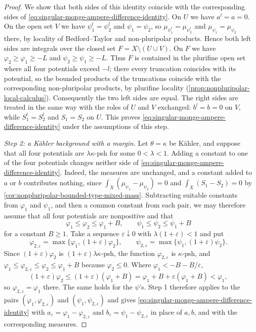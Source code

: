 \begin{proof}
We show that both sides of this identity coincide with the corresponding sides of \eqref{eq:singular-monge-ampere-difference-identity}. On $U$ we have $a^l=a=0$. On the open set $V$ we have $\psi_1^l=\psi_2^l$ and $\psi_1=\psi_2$, so $\mu_{\psi_1^l}=\mu_{\psi_2^l}$ and $\mu_{\psi_1}=\mu_{\psi_2}$ there, by locality of Bedford--Taylor and non-pluripolar products. Hence both left sides are integrals over the closed set $F=X\setminus(U\cup V)$. On $F$ we have $\varphi_2\geq\varphi_1\geq-L$ and $\psi_2\geq\psi_1\geq-L$. Thus $F$ is contained in the plurifine open set where all four potentials exceed $-l$; there every truncation coincides with its potential, so the bounded products of the truncations coincide with the corresponding non-pluripolar products, by plurifine locality (\cref{prop:nonpluripolar-local-calculus}). Consequently the two left sides are equal. The right sides are treated in the same way with the roles of $U$ and $V$ exchanged: $b^l=b=0$ on $V$, while $S_1^l=S_2^l$ and $S_1=S_2$ on $U$. This proves \eqref{eq:singular-monge-ampere-difference-identity} under the assumptions of this step.

\emph{Step 2: a K\"ahler background with a margin.} Let $\theta=\kappa$ be K\"ahler, and suppose that all four potentials are $\lambda\kappa$-psh for some $0<\lambda<1$. Adding a constant to one of the four potentials changes neither side of \eqref{eq:singular-monge-ampere-difference-identity}. Indeed, the measures are unchanged, and a constant added to $a$ or $b$ contributes nothing, since $\int_X(\mu_{\psi_1}-\mu_{\psi_2})=0$ and $\int_X(S_1-S_2)=0$ by \cref{cor:nonpluripolar-bounded-type-mixed-mass}. Subtracting suitable constants from $\varphi_1$ and $\psi_1$, and then a common constant from each pair, we may therefore assume that all four potentials are nonpositive and that
\[
 \varphi_1\leq\varphi_2\leq\varphi_1+B,
                 \qquad\psi_1\leq\psi_2\leq\psi_1+B
\]
for a constant $B\geq1$. Take a sequence $\varepsilon\downarrow0$ with $\lambda(1+\varepsilon)<1$ and put
\[
 \varphi_{2,\varepsilon}=\max\{\varphi_1,(1+\varepsilon)\varphi_2\},
 \qquad\psi_{2,\varepsilon}=\max\{\psi_1,(1+\varepsilon)\psi_2\}.
\]
Since $(1+\varepsilon)\varphi_2$ is $(1+\varepsilon)\lambda\kappa$-psh, the function $\varphi_{2,\varepsilon}$ is $\kappa$-psh, and $\varphi_1\leq\varphi_{2,\varepsilon}\leq\varphi_2\leq\varphi_1+B$ because $\varphi_2\leq0$. Where $\varphi_1<-B-B/\varepsilon$,
\[
 (1+\varepsilon)\varphi_2\leq(1+\varepsilon)(\varphi_1+B)=\varphi_1+B+\varepsilon(\varphi_1+B)<\varphi_1,
\]
so $\varphi_{2,\varepsilon}=\varphi_1$ there. The same holds for the $\psi$'s. Step 1 therefore applies to the pairs $(\varphi_1,\varphi_{2,\varepsilon})$ and $(\psi_1,\psi_{2,\varepsilon})$ and gives \eqref{eq:singular-monge-ampere-difference-identity} with $a_\varepsilon=\varphi_1-\varphi_{2,\varepsilon}$ and $b_\varepsilon=\psi_1-\psi_{2,\varepsilon}$ in place of $a,b$, and with the corresponding measures.


\end{proof}
